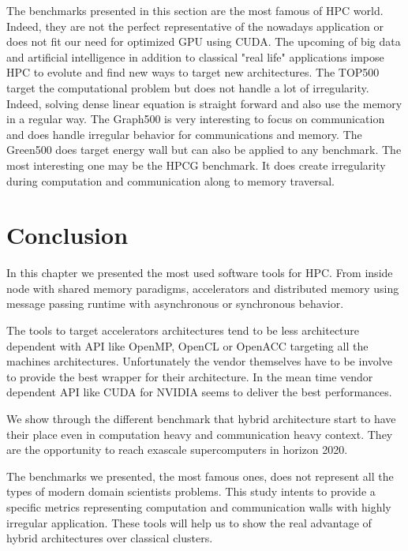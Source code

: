 The benchmarks presented in this section are the most famous of HPC world. 
Indeed, they are not the perfect representative of the nowadays application or does not fit our need for optimized GPU using CUDA. 
The upcoming of big data and artificial intelligence in addition to classical "real life" applications impose HPC to evolute and find new ways to target new architectures. 
The TOP500 target the computational problem but does not handle a lot of irregularity. 
Indeed, solving dense linear equation is straight forward and also use the memory in a regular way.
The Graph500 is very interesting to focus on communication and does handle irregular behavior for communications and memory. 
The Green500 does target energy wall but can also be applied to any benchmark. 
The most interesting one may be the HPCG benchmark. 
It does create irregularity during computation and communication along to memory traversal. 

\section{Conclusion}
In this chapter we presented the most used software tools for HPC. 
From inside node with shared memory paradigms, accelerators and distributed memory using message passing runtime with asynchronous or synchronous behavior. 

The tools to target accelerators architectures tend to be less architecture dependent with API like OpenMP, OpenCL or OpenACC targeting all the machines architectures. 
Unfortunately the vendor themselves have to be involve to provide the best wrapper for their architecture. 
In the mean time vendor dependent API like CUDA for NVIDIA seems to deliver the best performances.

We show through the different benchmark that hybrid architecture start to have their place even in computation heavy and communication heavy context. 
They are the opportunity to reach exascale supercomputers in horizon 2020.  

The benchmarks we presented, the most famous ones, does not represent all the types of modern domain scientists problems. 
This study intents to provide a specific metrics representing computation and communication walls with highly irregular application. 
These tools will help us to show the real advantage of hybrid architectures over classical clusters.
